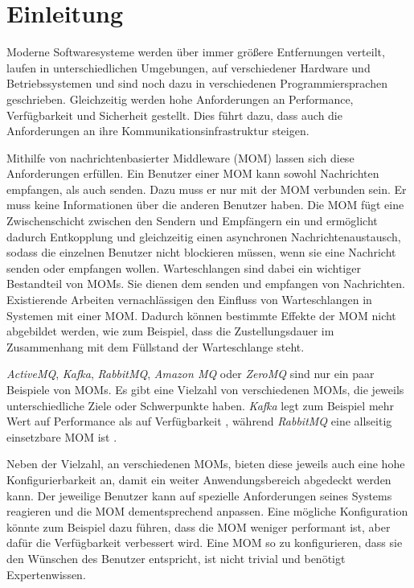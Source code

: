 
\chapter{Einleitung}
\label{ch:Introduction}
Moderne Softwaresysteme werden über immer größere Entfernungen verteilt, laufen in unterschiedlichen Umgebungen, auf verschiedener Hardware und Betriebssystemen und sind noch dazu in verschiedenen Programmiersprachen geschrieben. Gleichzeitig werden hohe Anforderungen an Performance, Verfügbarkeit und Sicherheit gestellt. Dies führt dazu, dass auch die Anforderungen an ihre Kommunikationsinfrastruktur steigen. \par
Mithilfe von nachrichtenbasierter Middleware (MOM) lassen sich diese Anforderungen erfüllen. Ein Benutzer einer MOM kann sowohl Nachrichten empfangen, als auch senden. Dazu muss er nur mit der MOM verbunden sein. Er muss keine Informationen über die anderen Benutzer haben. Die MOM fügt eine Zwischenschicht zwischen den Sendern und Empfängern ein und ermöglicht dadurch Entkopplung und gleichzeitig einen asynchronen Nachrichtenaustausch, sodass die einzelnen Benutzer nicht blockieren müssen, wenn sie eine Nachricht senden oder empfangen wollen. Warteschlangen sind dabei ein wichtiger Bestandteil von MOMs. Sie dienen dem senden und empfangen von Nachrichten. Existierende Arbeiten vernachlässigen den Einfluss von Warteschlangen in Systemen mit einer MOM. Dadurch können bestimmte Effekte der MOM nicht abgebildet werden, wie zum Beispiel, dass die Zustellungsdauer im Zusammenhang mit dem Füllstand der Warteschlange steht.\par
\emph{ActiveMQ}, \emph{Kafka}, \emph{RabbitMQ}, \emph{Amazon MQ} oder \emph{ZeroMQ} sind nur ein paar Beispiele von MOMs. Es gibt eine Vielzahl von verschiedenen MOMs, die jeweils unterschiedliche Ziele oder Schwerpunkte haben. \emph{Kafka} legt zum Beispiel mehr Wert auf Performance als auf Verfügbarkeit \cite{kafka}, während \emph{RabbitMQ} eine allseitig einsetzbare MOM ist \cite{rabbitmq}. \par
Neben der Vielzahl, an verschiedenen MOMs, bieten diese jeweils auch eine hohe Konfigurierbarkeit an, damit ein weiter Anwendungsbereich abgedeckt werden kann. Der jeweilige Benutzer kann auf spezielle Anforderungen seines Systems reagieren und die MOM dementsprechend anpassen. Eine mögliche Konfiguration könnte zum Beispiel dazu führen, dass die MOM weniger performant ist, aber dafür die Verfügbarkeit verbessert wird. Eine MOM so zu konfigurieren, dass sie den Wünschen des Benutzer entspricht, ist nicht trivial und benötigt Expertenwissen. 

